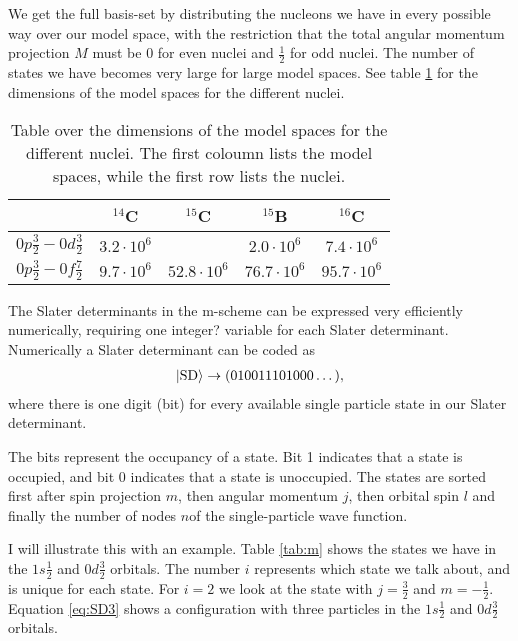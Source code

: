 We get the full basis-set by distributing the nucleons we have in every
possible way over our model space, with the restriction that the total angular
momentum projection $M$ must be $0$ for even nuclei and $\frac12$ for odd nuclei. The
number of states we have becomes very large for large model spaces. See table \ref{tab:dim} 
for the dimensions of the model spaces for the different nuclei.

\begin{table}
\begin{center}
\begin{tabular}{|c|c|c|c|c|}
	\hline
	& $^{14}$C & $^{15}$C & $^{15}$B & $^{16}$C \\
	\hline
	$0p\frac32-0d\frac32$ & $3.2\cdot10^6$ & & $2.0\cdot10^6$ & $7.4\cdot10^6$ \\
	\hline
	$0p\frac32-0f\frac72$ & $9.7\cdot10^6$ & $52.8\cdot10^6$ & $76.7\cdot10^6$ & $95.7\cdot10^6$ \\
	\hline
\end{tabular}
\caption{Table over the dimensions of the model spaces for the different nuclei. The first coloumn lists the model spaces, while the first row lists the nuclei.}
\label{tab:dim}
\end{center}
\end{table}


The Slater determinants in the m-scheme can be expressed very efficiently
numerically, requiring one integer? variable for each Slater determinant.
Numerically a Slater determinant can be coded as
\begin{align}
	\left| \textrm{SD} \right\rangle \rightarrow (010011101000\dots),
\end{align}
where there is one digit (bit) for every available single particle state in our
Slater determinant.

The bits represent the occupancy of a state. Bit 1 indicates that a state is
occupied, and bit 0 indicates that a state is unoccupied. The states are sorted
first after spin projection $m$, then angular momentum $j$, then orbital spin $l$
and finally the number of nodes $n$of the single-particle wave function.

I will illustrate this with an example. Table \ref{tab:m} shows the states we
have in the $1s\frac12$ and $0d\frac32$ orbitals. The number $i$ represents
which state we talk about, and is unique for each state. For $i = 2$ we look at
the state with $j = \frac32$ and $m = -\frac12$. Equation \ref{eq:SD3} shows a
configuration with three particles in the $1s\frac12$ and $0d\frac32$ orbitals.

